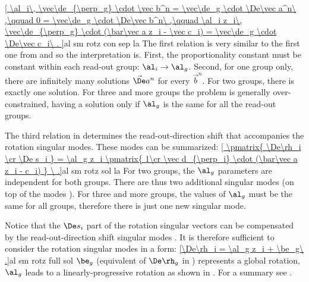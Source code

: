 \eqref{
	\al_i\, \vec\de_{\perp_g} \cdot \vec b^n = \vec\de_g \cdot \De\vec a^n\ ,\qquad
	0 = \vec\de_g \cdot \De\vec b^n\ ,\qquad
	\al_i z_i\, \vec\de_{\perp_g} \cdot (\bar\vec a z_i - \vec c_i) = \vec\de_g \cdot \De\vec c_i\ .
}{al sm rotz con sep la}
The first relation is very similar to the first one from  and so the interpretation is. First, the proportionality constant must be constant within each read-out group: $\al_i\to \al_g$. Second, for one group only, there are infinitely many solutions $\vec\De a^n$ for every $\vec b^n$. For two groups, there is exactly one solution. For three and more groups the problem is generally over-constrained, having a solution only if $\al_g$ is the same for all the read-out groups.

The third relation in  determines the read-out-direction shift that accompanies the rotation singular modes. These modes can be summarized:
\eqref{
\pmatrix{
	\De\rh_i \cr
	\De s_i
	}
= \al_g z_i \pmatrix{
	1\cr
	\vec d_{\perp_i} \cdot (\bar\vec a z_i - c_i)
}
\ .}{al sm rotz sol la}
For two groups, the $\al_g$ parameters are independent for both groups. There are thus two additional singular modes (on top of the modes ). For three and more groups, the values of $\al_g$ must be the same for all groups, therefore there is just one new singular mode.

Notice that the $\De s_i$ part of the rotation singular vectors  can be compensated by the read-out-direction shift singular modes . It is therefore sufficient to consider the rotation singular modes in a form:
\eqref{\De\rh_i = \al_g z_i + \be_g\ .}{al sm rotz full sol}
$\be_g$ (equivalent of $\De\rh_g$ in ) represents a global rotation, $\al_g$ leads to a linearly-progressive rotation as shown in . For a summary see .


